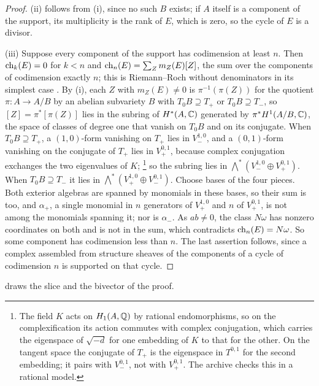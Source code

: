 \begin{proof}
(ii) follows from (i), since no such $B$ exists; if $A$ itself is a
component of the support, its multiplicity is the rank of $E$, which is zero,
so the cycle of $E$ is a divisor.

(iii) Suppose every component of the support has codimension at least $n$.
Then $\operatorname{ch}_{k}(E)=0$ for $k<n$ and $\operatorname{ch}_{n}(E)=\sum_{Z}m_{Z}(E)[Z]$, the sum
over the components of codimension exactly $n$; this is Riemann--Roch without
denominators in its simplest case \cite[Chapter~15]{Ful98}. By (i), each $Z$
with $m_{Z}(E)\ne0$ is $\pi^{-1}(\pi(Z))$ for the quotient $\pi\colon A\to A/B$
by an abelian subvariety $B$ with $T_{0}B\supseteq T_{+}$ or
$T_{0}B\supseteq T_{-}$, so $[Z]=\pi^{*}[\pi(Z)]$ lies in the subring of
$H^{*}(A,\mathbb{C})$ generated by $\pi^{*}H^{1}(A/B,\mathbb{C})$, the space of classes of
degree one that vanish on $T_{0}B$ and on its conjugate. When
$T_{0}B\supseteq T_{+}$, a
$(1,0)$-form vanishing on $T_{+}$ lies in $V_{-}^{1,0}$, and a $(0,1)$-form
vanishing on the conjugate of $T_{+}$ lies in $V_{+}^{0,1}$, because complex
conjugation exchanges the two eigenvalues of $K$;%
\footnote{The field $K$ acts on $H_{1}(A,\mathbb{Q})$ by rational endomorphisms, so
on the complexification its action commutes with complex conjugation, which
carries the eigenspace of $\sqrt{-d}$ for one embedding of $K$ to that for the
other. On the tangent space the conjugate of $T_{+}$ is the eigenspace in
$T^{0,1}$ for the second embedding; it pairs with $V_{-}^{0,1}$, not with
$V_{+}^{0,1}$. The archive \cite{BMB26} checks this in a rational model.}
so the subring lies in $\bigwedge^{*}(V_{-}^{1,0}\oplus V_{+}^{0,1})$. When
$T_{0}B\supseteq T_{-}$ it lies in $\bigwedge^{*}(V_{+}^{1,0}\oplus
V_{-}^{0,1})$. Choose bases of the four pieces. Both exterior algebras are
spanned by monomials in these bases, so their sum is too, and $\alpha_{+}$, a
single monomial in $n$ generators of $V_{+}^{1,0}$ and $n$ of $V_{+}^{0,1}$,
is not among the monomials spanning it; nor is $\alpha_{-}$. As $ab\ne0$, the
class $N\omega$ has nonzero coordinates on both and is not in the sum, which
contradicts $\operatorname{ch}_{n}(E)=N\omega$. So some component has codimension less
than $n$. The last assertion follows, since a complex assembled from
structure sheaves of the components of a cycle of codimension $n$ is
supported on that cycle.
\end{proof}

 draws the slice and the bivector of the proof.

